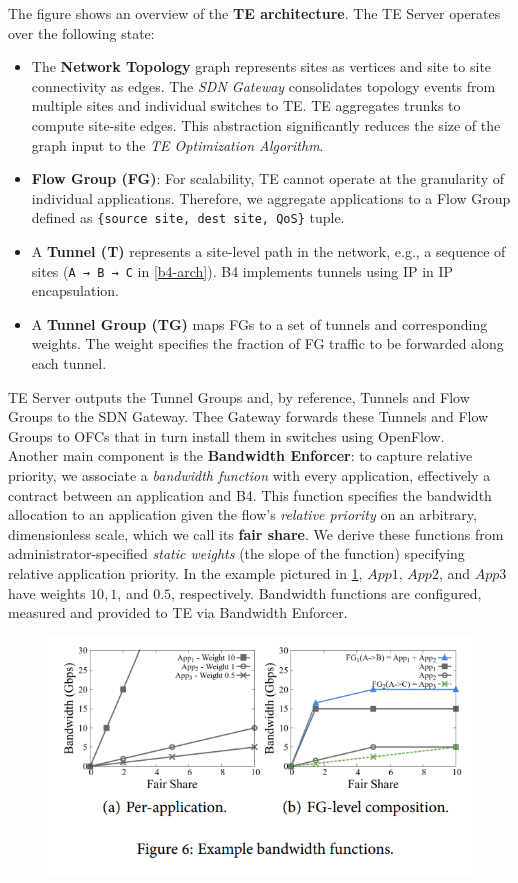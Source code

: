 \documentclass[10pt,a4paper]{report}
\theoremstyle{definition}
\begin{document}
The figure shows an overview of the \textbf{TE architecture}. The TE Server operates over the following state:
\begin{itemize}
	\item 
	The \textbf{Network Topology} graph represents sites as vertices and site to site connectivity as edges. The \textit{SDN Gateway} consolidates topology events from multiple sites and individual switches to TE. TE aggregates trunks to compute site-site edges. This abstraction significantly reduces the size of the graph input to the \textit{TE Optimization Algorithm}.
	\item 
	\textbf{Flow Group (FG)}: For scalability, TE cannot operate at the granularity of individual applications. Therefore, we aggregate applications to a Flow Group defined as \texttt{\{source site, dest site, QoS\}} tuple.
	\item 
	A \textbf{Tunnel (T)} represents a site-level path in the network, e.g., a sequence of sites (\texttt{A → B → C} in \ref{b4-arch}). B4 implements tunnels using IP in IP encapsulation.
	\item 
	A \textbf{Tunnel Group (TG)} maps FGs to a set of tunnels and corresponding weights. The weight specifies the fraction of FG traffic to be forwarded along each tunnel.
\end{itemize}
TE Server outputs the Tunnel Groups and, by reference, Tunnels and Flow Groups to the SDN Gateway. Thee Gateway forwards these Tunnels and Flow Groups to OFCs that in turn install them in switches using OpenFlow.\\
Another main component is the \textbf{Bandwidth Enforcer}:  to capture relative priority, we associate a \textit{bandwidth function} with every application, effectively a contract between an application and B4. This function specifies the bandwidth allocation to an application given the flow’s \textit{relative priority} on an arbitrary, dimensionless scale, which we call its \textbf{fair share}.
We derive these functions from administrator-specified \textit{static weights} (the slope of the function) specifying relative application priority. In the example pictured in \ref{traffic-enforcer-functions}, $App1$, $App2$, and $App3$ have weights $10, 1$, and $0.5$, respectively. Bandwidth functions are configured, measured and provided to TE via Bandwidth Enforcer.
\begin{figure}[h!]
	\centering\includegraphics[scale=0.50]{images/Pasted image 20230330105706.png}
\label{traffic-enforcer-functions}
\end{figure}
\end{document}
